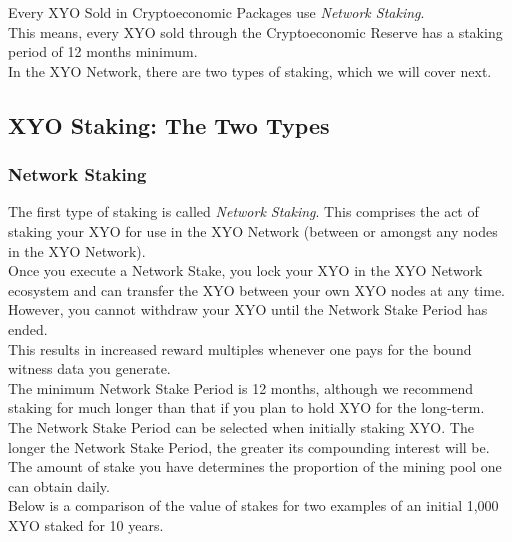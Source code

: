 \documentclass{article}
\begin{document}
Every XYO Sold in Cryptoeconomic Packages use \textit{Network Staking}.\\

This means, every XYO sold through the Cryptoeconomic Reserve has a staking period of 12 months minimum.\\

In the XYO Network, there are two types of staking, which we will cover next.

\subsection{XYO Staking: The Two Types}

\subsubsection{Network Staking}

The first type of staking is called \textit{Network Staking}. This comprises the act of staking your XYO for use in the XYO Network (between or amongst any nodes in the XYO Network).\\

Once you execute a Network Stake, you lock your XYO in the XYO Network ecosystem and can transfer the XYO between your own XYO nodes at any time. However, you cannot withdraw your XYO until the Network Stake Period has ended.\\

This results in increased reward multiples whenever one pays for the bound witness data you generate.\\

The minimum Network Stake Period is 12 months, although we recommend staking for much longer than that if you plan to hold XYO for the long-term.\\

The Network Stake Period can be selected when initially staking XYO. The longer the Network Stake Period, the greater its compounding interest will be. The amount of stake you have determines the proportion of the mining pool one can obtain daily.\\

Below is a comparison of the value of stakes for two examples of an initial 1,000 XYO staked for 10 years.\\
\end{document}
